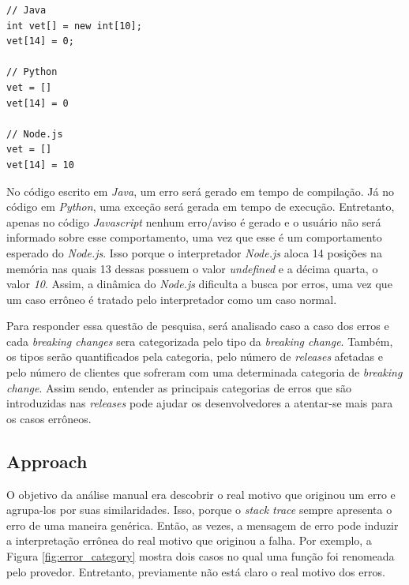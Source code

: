 \begin{lstlisting}[style=javascript, label=cod:wrong:access, caption={Acesso inválido à posição de memória}, numbers=none]
// Java
int vet[] = new int[10];
vet[14] = 0;

// Python
vet = []
vet[14] = 0

// Node.js
vet = []
vet[14] = 10
\end{lstlisting}

No código escrito em \textit{Java}, um erro será gerado em tempo de compilação. Já no código em \textit{Python}, uma exceção será gerada em tempo de execução. Entretanto, apenas no código \textit{Javascript} nenhum erro/aviso é gerado e o usuário não será informado sobre esse comportamento, uma vez que esse é um comportamento esperado do \textit{Node.js}. Isso porque o interpretador \textit{Node.js} aloca 14 posições na memória nas quais 13 dessas possuem o valor \textit{undefined} e a décima quarta, o valor \textit{10}. Assim, a dinâmica do \textit{Node.js} dificulta a busca por erros, uma vez que um caso errôneo é tratado pelo interpretador como um caso normal.


Para responder essa questão de pesquisa, será analisado caso a caso dos erros e cada \textit{breaking changes} sera categorizada pelo tipo da \textit{breaking change}. Também, os tipos serão quantificados pela categoria, pelo número de \textit{releases} afetadas e pelo número de clientes que sofreram com uma determinada categoria de \textit{breaking change}. Assim sendo, entender as principais categorias de erros que são introduzidas nas \textit{releases} pode ajudar os desenvolvedores a atentar-se mais para os casos errôneos.

\subsection{Approach}
\label{apr:rq2}

O objetivo da análise manual era descobrir o real motivo que originou um erro e agrupa-los por suas similaridades. Isso, porque o \textit{stack trace} sempre apresenta o erro de uma maneira genérica. Então, as vezes, a mensagem de erro pode induzir a interpretação errônea do real motivo que originou a falha. Por exemplo, a Figura \ref{fig:error_category} mostra dois casos no qual uma função foi renomeada pelo provedor. Entretanto, previamente não está claro o real motivo dos erros.

